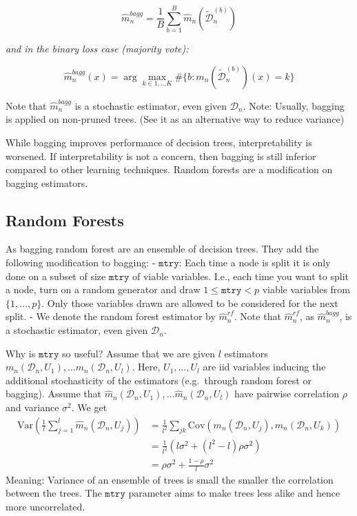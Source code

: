 \documentclass[a4paper,10pt,openany]{book}
\begin{document}
\[
\hat m^{bagg}_n=\frac 1 B \sum_{b=1}^B \hat m_n(\tilde {\mathcal D}^{(b)}_n)
\]

\emph{and in the binary loss case (majority vote):}

\[
\hat m^{bagg}_n(x)=\arg \max_{k\in {1,\dots K}} \#\{b: m_n(\tilde {\mathcal D}^{(b)}_n) (x)=k\}
\]

Note that \(\hat m^{bagg}_n\) is a stochastic estimator, even given \(\mathcal D_n\). Note: Usually, bagging is applied on non-pruned trees. (See it as an alternative way to reduce variance)

While bagging improves performance of decision trees, interpretability is worsened. If interpretability is not a concern, then bagging is still inferior compared to other learning techniques. Random forests are a modification on bagging estimators.

\hypertarget{random-forests}{%
\subsection{Random Forests}\label{random-forests}}

 As bagging random forest are an ensemble of decision trees. They add the following modification to bagging:
- \(\texttt{mtry}\): Each time a node is split it is only done on a subset of size \(\texttt{mtry}\) of viable variables. I.e., each time you want to split a node, turn on a random generator and draw \(1\leq\texttt{mtry}<p\) viable variables from \(\{1,\dots,p\}\). Only those variables drawn are allowed to be considered for the next split.
- We denote the random forest estimator by \(\hat m^{rf}_n\). Note that \(\hat m^{rf}_n\), as \(\hat m^{bagg}_n\), is a stochastic estimator, even given \(\mathcal D_n\).

Why is \(\texttt{mtry}\) so useful? Assume that we are given \(l\) estimators \(m_n(\mathcal D_n, U_1), \dots m_n(\mathcal D_n, U_l)\). Here, \(U_1,\dots, U_l\) are iid variables inducing the additional stochasticity of the estimators (e.g.~through random forest or bagging). Assume that \(\hat m_n(\mathcal D_n, U_1), \dots \hat m_n(\mathcal D_n, U_l)\) have pairwise correlation \(\rho\) and variance \(\sigma^2\). We get
\begin{align*}
\textrm{Var}\left (\frac 1 l \sum_{j=1}^l \hat m_n(\mathcal D_n, U_j)\right)&= \frac 1 {l^2} \sum_{jk} \textrm{Cov}(m_n(\mathcal D_n, U_j),m_n(\mathcal D_n, U_k))\\&=\frac 1 {l^2} \left( l\sigma^2+ (l^2-l)\rho\sigma^2\right)\\&= \rho \sigma^2 + \frac{1-\rho}{l}\sigma^2
\end{align*}
Meaning: Variance of an ensemble of trees is small the smaller the correlation between the trees. The \(\texttt{mtry}\) parameter aims to make trees less alike and hence more uncorrelated.
\end{document}
